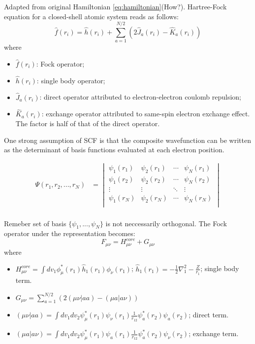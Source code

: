 \documentclass[11pt]{article}
\begin{document}
Adapted from original Hamiltonian \ref{eq:hamiltonian}(How?). Hartree-Fock equation for a closed-shell atomic system reads as follows:
\cite{Fock_matrix_source}
\begin{equation}
\label{eq:hartree-fock}
\hat{f}(r_i) = \hat{h}(r_i)+\sum_{a=1}^{N/2}(2\hat{J}_a(r_i)-\hat{K}_a(r_i))
\end{equation}
where
\begin{itemize}
    \item $\hat{f}(r_i)$: Fock operator;
    \item $\hat{h}(r_i)$: single body operator;
    \item $\hat{J}_a(r_i)$: direct operator attributed to electron-electron coulomb repulsion;
    \item $\hat{K}_a(r_i)$: exchange operator attributed to same-spin electron exchange effect. The factor is half of that of the direct operator. 
\end{itemize}
One strong assumption of SCF is that the composite wavefunction can be written as the determinant of basis functions evaluated at each electron position. 

\begin{align*}
    \Psi(r_1, r_2, ..., r_N) &= 
    \begin{vmatrix}
    \psi_1(r_1) & \psi_2(r_1)  & \cdots & \psi_N(r_1) \\ 
    \psi_1(r_2) & \psi_2(r_2) & \cdots & \psi_N(r_2) \\ 
    \vdots & \vdots& \ddots & \vdots \\
    \psi_1(r_N) & \psi_2(r_N) & \cdots & \psi_N(r_N) \\ 
    \end{vmatrix} \\
\end{align*}

Remeber set of basis $\{\psi_1, ... , \psi_N\}$ is not neccessarily orthogonal. The Fock operator under the representation becomes:
\begin{equation}\label{eq:fock-representation}
    F_{\mu\nu}=H^{core}_{\mu\nu} + G_{\mu\nu}
\end{equation}
where 
\begin{itemize}
    \item $H^{core}_{\mu \nu} = \int{dv_1 \phi_{\mu}^*(r_1)\hat{h}_1(r_1)\phi_{\nu}(r_1)}$; $\hat{h}_1(r_1)=-\frac{1}{2}\nabla^2_1-\frac{Z}{r_1}$; single body term.
    \item $G_{\mu\nu} = \sum_{a=1}^{N/2}(2(\mu\nu|aa)-(\mu a|a\nu))$
    \item $(\mu\nu|aa)=\int{dv_1 dv_2 \psi_{\mu}^*(r_1)\psi_{\nu}(r_1) \frac{1}{r_{12}} \psi_a^*(r_2)\psi_a(r_2)}$; direct term.
    \item $(\mu a|a\nu)=\int{dv_1 dv_2 \psi_{\mu}^*(r_1)\psi_{a}(r_1) \frac{1}{r_{12}} \psi_a^*(r_2)\psi_{\nu}(r_2)}$; exchange term.
\end{itemize}
\end{document}
